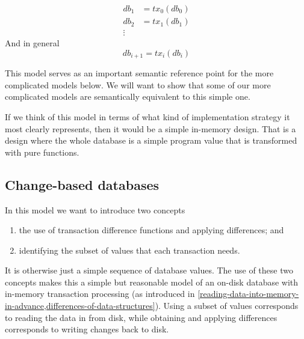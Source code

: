 \documentclass[11pt,a4paper]{article}
\begin{document}
\begin{center}
\begin{align*}
 \mathit{db}_1 & = \mathit{tx}_0(\mathit{db}_0) \\
 \mathit{db}_2 & = \mathit{tx}_1(\mathit{db}_1) \\
 \vdots
\end{align*}
And in general
\begin{equation}
\label{eq:sequential-recurrence}
\mathit{db}_{i+1} = \mathit{tx}_i(\mathit{db}_i)
\end{equation}
\end{center}
This model serves as an important semantic reference point for the more
complicated models below. We will want to show that some of our more
complicated models are semantically equivalent to this simple one.

If we think of this model in terms of what kind of implementation strategy it
most clearly represents, then it would be a simple in-memory design. That is a
design where the whole database is a simple program value that is transformed
with pure functions.

\subsection{Change-based databases}
\label{change-based-databases}

In this model we want to introduce two concepts
\begin{enumerate}
\item the use of transaction difference functions and applying differences; and
\item identifying the subset of values that each transaction needs.
\end{enumerate}
It is otherwise just a simple sequence of database values. The use of these two
concepts makes this a simple but reasonable model of an on-disk database with
in-memory transaction processing (as introduced in
\cref{reading-data-into-memory-in-advance,differences-of-data-structures}).
Using a subset of values corresponds to reading the data in from disk, while
obtaining and applying differences corresponds to writing changes back to disk.
\end{document}
